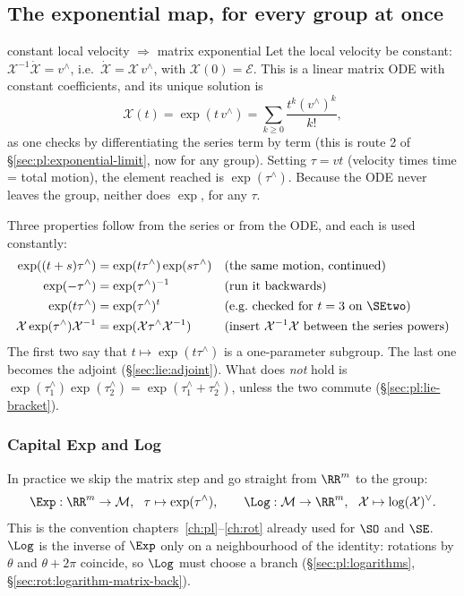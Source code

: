 \subsection{The exponential map, for every group at once}\label{sec:lie:exp}

\begin{deriv}{constant local velocity $\Rightarrow$ matrix exponential}
Let the local velocity be constant: $\mathcal X^{-1}\dot{\mathcal X}=v^\wedge$, i.e.\ $\dot{\mathcal X}=\mathcal X\,v^\wedge$, with $\mathcal X(0)=\mathcal E$. This is a linear matrix ODE with constant coefficients, and its unique solution is
\[
\mathcal X(t)=\exp(t\,v^\wedge)=\sum_{k\ge0}\frac{t^k(v^\wedge)^k}{k!},
\]
as one checks by differentiating the series term by term (this is route 2 of \S\ref{sec:pl:exponential-limit}, now for any group). Setting $\tau=vt$ (velocity times time = total motion), the element reached is $\exp(\tau^\wedge)$. Because the ODE never leaves the group, neither does $\exp$, for any $\tau$.
\end{deriv}

Three properties follow from the series or from the ODE, and each is used constantly:
\begin{align*}
\exp((t+s)\tau^\wedge)&=\exp(t\tau^\wedge)\exp(s\tau^\wedge) &&\text{(the same motion, continued)}\\
\exp(-\tau^\wedge)&=\exp(\tau^\wedge)^{-1} &&\text{(run it backwards)}\\
\exp(t\tau^\wedge)&=\exp(\tau^\wedge)^t &&\text{(e.g.\ checked for $t=3$ on $\SEtwo$)}\\
\mathcal X\exp(\tau^\wedge)\mathcal X^{-1}&=\exp(\mathcal X\tau^\wedge\mathcal X^{-1}) &&\text{(insert $\mathcal X^{-1}\mathcal X$ between the series powers)}
\end{align*}
The first two say that $t\mapsto\exp(t\tau^\wedge)$ is a one-parameter subgroup. The last one becomes the adjoint (\S\ref{sec:lie:adjoint}). What does \emph{not} hold is $\exp(\tau_1^\wedge)\exp(\tau_2^\wedge)=\exp(\tau_1^\wedge+\tau_2^\wedge)$, unless the two commute (\S\ref{sec:pl:lie-bracket}).

\subsubsection{Capital Exp and Log}
In practice we skip the matrix step and go straight from $\RR^m$ to the group:
\[
\Exp:\RR^m\to\mathcal M,\ \ \tau\mapsto\exp(\tau^\wedge),\qquad \Log:\mathcal M\to\RR^m,\ \ \mathcal X\mapsto\log(\mathcal X)^\vee .
\]
This is the convention chapters~\ref{ch:pl}--\ref{ch:rot} already used for $\SO$ and $\SE$. $\Log$ is the inverse of $\Exp$ only on a neighbourhood of the identity: rotations by $\theta$ and $\theta+2\pi$ coincide, so $\Log$ must choose a branch (\S\ref{sec:pl:logarithms}, \S\ref{sec:rot:logarithm-matrix-back}).

